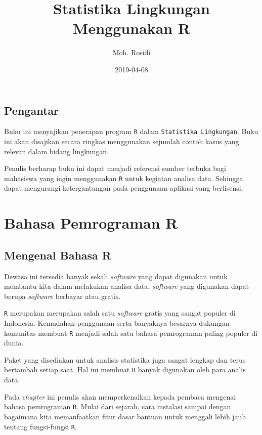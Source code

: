 \documentclass[]{book}
\title{Statistika Lingkungan Menggunakan R}
\author{Moh. Rosidi}
\date{2019-04-08}
\begin{document}
\maketitle

{
\hypersetup{linkcolor=black}
\setcounter{tocdepth}{1}
\tableofcontents
}
\listoftables
\listoffigures
\chapter*{Pengantar}\label{pengantar}

Buku ini menyajikan penerapan program \texttt{R} dalam
\texttt{Statistika\ Lingkungan}. Buku ini akan disajikan secara ringkas
menggunakan sejumlah contoh kasus yang relevan dalam bidang lingkungan.

Penulis berharap buku ini dapat menjadi referensi sumber terbuka bagi
mahasiswa yang ingin menggunakan \texttt{R} untuk kegiatan analisa data.
Sehingga dapat mengurangi ketergantungan pada penggunaan aplikasi yang
berlisensi.

\part*{Bahasa Pemrograman R}\label{part-bahasa-pemrograman-r}

\chapter{Mengenal Bahasa R}\label{mengenal-bahasa-r}

Dewasa ini tersedia banyak sekali \emph{software} yang dapat digunakan
untuk membantu kita dalam melakukan analisa data. \emph{software} yang
digunakan dapat berupa \emph{software} berbayar atau gratis.

\texttt{R} merupakan merupakan salah satu \emph{software} gratis yang
sangat populer di Indonesia. Kemudahan penggunaan serta banyaknya
besarnya dukungan komunitas membuat \texttt{R} menjadi salah satu bahasa
pemrograman paling populer di dunia.

Paket yang disediakan untuk analisis statistika juga sangat lengkap dan
terus bertambah setiap saat. Hal ini membuat \texttt{R} banyak digunakan
oleh para analis data.

Pada \emph{chapter} ini penulis akan memperkenalkan kepada pembaca
mengenai bahasa pemrograman \texttt{R}. Mulai dari sejarah, cara
instalasi sampai dengan bagaimana kita memanfaatkan fitur dasar bantuan
untuk menggali lebih jauh tentang fungsi-fungsi \texttt{R}.
\end{document}
